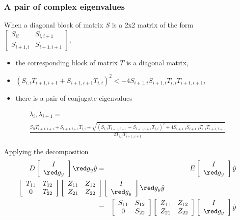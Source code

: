 \documentclass{beamer}
\begin{document}
\begin{frame}
\frametitle{A pair of complex eigenvalues}
When a diagonal block of matrix $S$ is a 2x2 matrix of the form 
$\left[
\begin{array}{cc}
S_{ii} & S_{i,i+1}\\
S_{i+1,i} & S_{i+1,i+1}
\end{array}\right]$,
\begin{itemize}
\item the corresponding block of matrix $T$ is a diagonal matrix,
\item $\left(S_{i,i}T_{i+1,i+1}+S_{i+1,i+1}T_{i,i}\right)^2<-4S_{i+1,i}S_{i+1,i}T_{i,i}T_{i+1,i+1}$,
\item there is a pair of conjugate eigenvalues
\end{itemize}
{\footnotesize
\begin{multline*}
\lambda_i, \lambda_{i+1} =\\
\frac{S_{ii}T_{i+1,i+1}+S_{i+1,i+1}T_{i,i}\pm\sqrt{\left(S_{i,i}T_{i+1,i+1}-S_{i+1,i+1}T_{i,i}\right)^2+4S_{i+1,i}S_{i+1,i}T_{i,i}T_{i+1,i+1}}}{2T_{i,i}T_{i+1,i+1}}  
\end{multline*}
}
\end{frame}

\begin{slide}{Applying the decomposition}
\begin{eqnarray*}
D\left[\begin{array}{c} I\\{\red g_y}\end{array}\right]{\red g_y}\hat y
&=&
E\left[\begin{array}{c} I\\{\red g_y}\end{array}\right]\hat y\\
\lefteqn{\left[\begin{array}{cc}T_{11} & T_{12}\\0 & T_{22}\end{array}\right]
\left[\begin{array}{cc}Z_{11} & Z_{12}\\Z_{21} & Z_{22}\end{array}\right]
\left[\begin{array}{c} I\\{\red g_y}\end{array}\right]{\red g_y}\hat y}\hspace{40mm}\\
&=&
\left[\begin{array}{cc}S_{11} & S_{12}\\0 & S_{22}\end{array}\right]
\left[\begin{array}{cc}Z_{11} & Z_{12}\\Z_{21} & Z_{22}\end{array}\right]
\left[\begin{array}{c} I\\{\red g_y}\end{array}\right]\hat y
\end{eqnarray*}
\end{slide}
\end{document}
